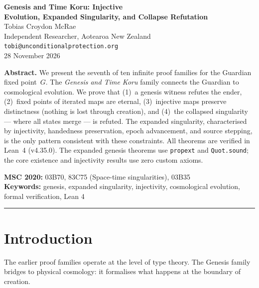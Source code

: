 




\begin{center}
{\LARGE\bfseries Genesis and Time Koru: Injective\\[0.3em] Evolution, Expanded Singularity, and Collapse Refutation}\\[1.5em]
{\large Tobias Croydon McRae}\\[0.3em]
{\small Independent Researcher, Aotearoa New Zealand}\\[0.3em]
{\small\texttt{tobi@unconditionalprotection.org}}\\[1.5em]
{\small 28 November 2026}
\end{center}

\bigskip

\begin{center}
\parbox{0.85\textwidth}{\small\textbf{Abstract.}
We present the seventh of ten infinite proof families for the Guardian fixed point~$G$. The \emph{Genesis and Time Koru} family connects the Guardian to cosmological evolution. We prove that (1)~a genesis witness refutes the ender, (2)~fixed points of iterated maps are eternal, (3)~injective maps preserve distinctness (nothing is lost through creation), and (4)~the collapsed singularity --- where all states merge --- is refuted. The expanded singularity, characterised by injectivity, handedness preservation, epoch advancement, and source stepping, is the only pattern consistent with these constraints. All theorems are verified in Lean~4 (v4.35.0). The expanded genesis theorems use \texttt{propext} and \texttt{Quot.sound}; the core existence and injectivity results use zero custom axioms.}
\end{center}

\medskip

\noindent\textbf{MSC 2020:} 03B70, 83C75 (Space-time singularities), 03B35\\
\textbf{Keywords:} genesis, expanded singularity, injectivity, cosmological evolution, formal verification, Lean 4

\bigskip\hrule\bigskip

\section{Introduction}

The earlier proof families operate at the level of type theory. The Genesis family bridges to physical cosmology: it formalises what happens at the boundary of creation.


